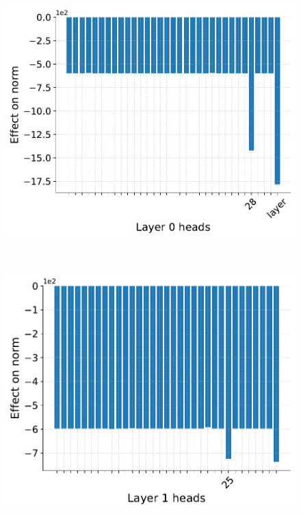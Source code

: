 \begin{figure}[t]
  \centering
  \begin{minipage}{0.33\textwidth}
      \centering
      \label{fig:appendix-ablation-delim-0}
      \vspace{-.2em}
      \includegraphics[width=\linewidth]{Figures/figures_circuit/interventions/delim_no_rope/delim_massive_suppression_L0.pdf}
  \end{minipage}~
  \begin{minipage}{0.33\textwidth}
      \centering
      \label{fig:appendix-ablation-delim-1}
      \vspace{-.2em}
      \includegraphics[width=\linewidth]{Figures/figures_circuit/interventions/delim_no_rope/delim_massive_suppression_L1.pdf}

\end{minipage}
\end{figure}
